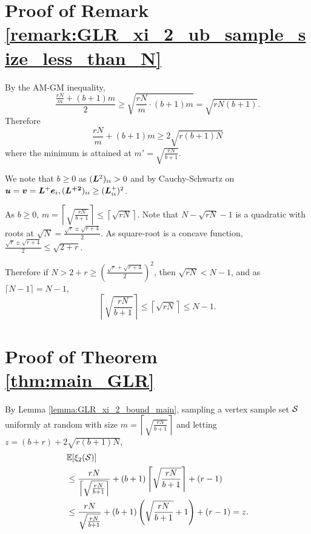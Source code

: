\iffalse
\section{Proof of Remark \ref{remark:GLR_xi_2_ub_sample_size_less_than_N}}
\label{app:GLR_xi_2_ub_sample_size_less_than_N}
By the AM-GM inequality, 
\begin{equation}
 \frac{\frac{rN}{m}+(b+1)m}{2} \geq \sqrt{\frac{rN}{m} \cdot (b+1)m} = \sqrt{rN(b+1)}. 
\end{equation}
Therefore
\begin{equation}
    \frac{rN}{m} + (b+1)m \geq 2\sqrt{r(b+1)N}
\end{equation}
where the minimum is attained at $m' = \sqrt{\frac{rN}{b+1}}$.

We note that $b\geq 0$ as $(\bm{L}^{2})_{ii} > 0$ and by Cauchy-Schwartz on $\bm{u}=\bm{v} = \bm{L}^{+}\bm{e}_{i}, (\bm{L^{+ 2}})_{ii} \geq (\bm{L}^{+}_{ii})^{2}$.

As $b\geq 0$, $m = \left\lceil \sqrt{\frac{rN}{b+1}} \right\rceil \leq \left\lceil \sqrt{rN}\right\rceil$. Note that $N - \sqrt{rN} - 1$ is a quadratic with roots at $\sqrt{N} = \frac{\sqrt{r} \pm \sqrt{r+4}}{2}$. As square-root is a concave function, $\frac{\sqrt{r} \pm \sqrt{r+4}}{2} \leq \sqrt{2+r} $.


Therefore if $N > 2+r \geq \left(\frac{\sqrt{r} + \sqrt{r+4}}{2}\right)^{2}$, then $\sqrt{rN} < N-1$, and as $\lceil N-1\rceil = N-1$,
\begin{equation}
    \left\lceil \sqrt{\frac{r N}{b+1}}\right\rceil \leq \left\lceil \sqrt{rN}\right\rceil \leq N-1.
\end{equation}


\section{Proof of Theorem \ref{thm:main_GLR}}
\label{app:Proof_main_GLR}
By Lemma \ref{lemma:GLR_xi_2_bound_main}, sampling a vertex sample set $\mathcal{S}$ uniformly at random with size $m = \left\lceil \sqrt{\frac{rN}{b+1}} \right\rceil$ and letting $z = (b+r)+2\sqrt{r(b+1)N}$,
\begin{align}
&\mathbb{E}[\xi_{2}(\mathcal{S})] \\
&\leq \frac{rN}{\left\lceil \sqrt{\frac{rN}{b+1}} \right\rceil} + (b+1)\left\lceil \sqrt{\frac{rN}{b+1}} \right\rceil + (r - 1) \\
&\leq \frac{rN}{ \sqrt{\frac{rN}{b+1}} } + (b+1)\left(\sqrt{\frac{rN}{b+1}} + 1\right) + (r-1) = z.
\label{eq:xi_2_b_bound_quick} \end{align}

